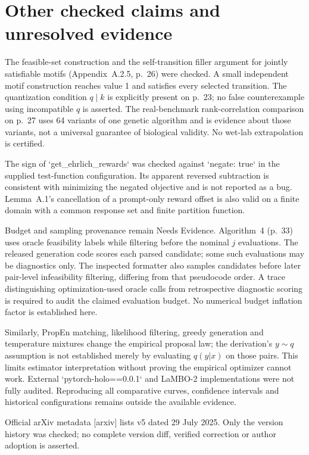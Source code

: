 \documentclass[10pt]{article}
\begin{document}
\section*{Other checked claims and unresolved evidence}
The feasible-set construction and the self-transition filler argument for jointly satisfiable motifs (Appendix A.2.5, p. 26) were checked. A small independent motif construction reaches value 1 and satisfies every selected transition. The quantization condition \(q\mid k\) is explicitly present on p. 23; no false counterexample using incompatible \(q\) is asserted. The real-benchmark rank-correlation comparison on p. 27 uses 64 variants of one genetic algorithm and is evidence about those variants, not a universal guarantee of biological validity. No wet-lab extrapolation is certified.\par
The sign of `get\_ehrlich\_rewards` was checked against `negate: true` in the supplied test-function configuration. Its apparent reversed subtraction is consistent with minimizing the negated objective and is not reported as a bug. Lemma A.1’s cancellation of a prompt-only reward offset is also valid on a finite domain with a common response set and finite partition function.\par
Budget and sampling provenance remain Needs Evidence. Algorithm 4 (p. 33) uses oracle feasibility labels while filtering before the nominal \(j\) evaluations. The released generation code scores each parsed candidate; some such evaluations may be diagnostics only. The inspected formatter also samples candidates before later pair-level infeasibility filtering, differing from that pseudocode order. A trace distinguishing optimization-used oracle calls from retrospective diagnostic scoring is required to audit the claimed evaluation budget. No numerical budget inflation factor is established here.\par
Similarly, PropEn matching, likelihood filtering, greedy generation and temperature mixtures change the empirical proposal law; the derivation’s \(y\sim q\) assumption is not established merely by evaluating \(q(y|x)\) on those pairs. This limits estimator interpretation without proving the empirical optimizer cannot work. External `pytorch-holo==0.0.1` and LaMBO-2 implementations were not fully audited. Reproducing all comparative curves, confidence intervals and historical configurations remains outside the available evidence.\par
Official arXiv metadata [arxiv] lists v5 dated 29 July 2025. Only the version history was checked; no complete version diff, verified correction or author adoption is asserted.\par
\end{document}
